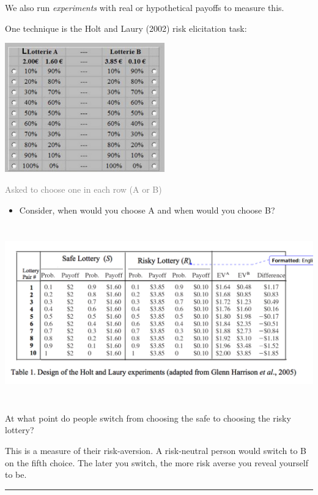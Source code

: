 \documentclass[]{article}
\providecommand{\tightlist}{%
  \setlength{\itemsep}{0pt}\setlength{\parskip}{0pt}}
\begin{document}
We also run \emph{experiments} with real or hypothetical payoffs to
measure this.

One technique is the Holt and Laury (2002) risk elicitation task:

\includegraphics[height=2.2in]{picsfigs/holtlaurie.png}

\textcolor{gray}{Asked to choose one in each row (A or B)}

\begin{itemize}
\tightlist
\item
  Consider, when would you choose A and when would you choose B?
\end{itemize}

\bigskip

\includegraphics[height=3in]{picsfigs/holtlauriedetail.png}

At what point do people switch from choosing the safe to choosing the
risky lottery?

This is a measure of their risk-aversion. A risk-neutral person would
switch to B on the fifth choice. The later you switch, the more risk
averse you reveal yourself to be.

\begin{center}\rule{0.5\linewidth}{\linethickness}\end{center}
\end{document}
